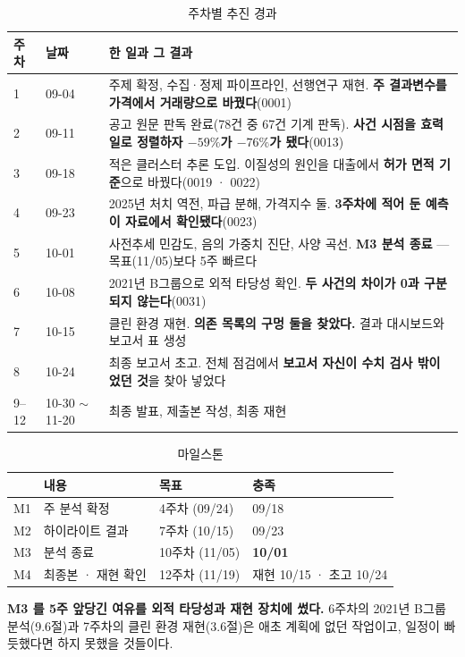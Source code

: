 \begin{table}[htbp]
  \centering
  \caption{주차별 추진 경과}
  \label{tab:v2-schedule}
  \footnotesize
  \begin{tabular}{llp{9.6cm}}
    \toprule
    \textbf{주차} & \textbf{날짜} & \textbf{한 일과 그 결과} \\
    \midrule
    1 & 09-04 & 주제 확정, 수집·정제 파이프라인, 선행연구 재현.
      \textbf{주 결과변수를 가격에서 거래량으로 바꿨다}(0001) \\
    2 & 09-11 & 공고 원문 판독 완료(78건 중 67건 기계 판독).
      \textbf{사건 시점을 효력일로 정렬하자 $-59\%$가 $-76\%$가 됐다}(0013) \\
    3 & 09-18 & 적은 클러스터 추론 도입. 이질성의 원인을 대출에서
      \textbf{허가 면적 기준}으로 바꿨다(0019 · 0022) \\
    4 & 09-23 & 2025년 처치 역전, 파급 분해, 가격지수 둘.
      \textbf{3주차에 적어 둔 예측이 자료에서 확인됐다}(0023) \\
    5 & 10-01 & 사전추세 민감도, 음의 가중치 진단, 사양 곡선.
      \textbf{M3 분석 종료} --- 목표(11/05)보다 5주 빠르다 \\
    6 & 10-08 & 2021년 B그룹으로 외적 타당성 확인.
      \textbf{두 사건의 차이가 0과 구분되지 않는다}(0031) \\
    7 & 10-15 & 클린 환경 재현. \textbf{의존 목록의 구멍 둘을 찾았다.}
      결과 대시보드와 보고서 표 생성 \\
    8 & 10-24 & 최종 보고서 초고. 전체 점검에서
      \textbf{보고서 자신이 수치 검사 밖이었던 것}을 찾아 넣었다 \\
    9--12 & 10-30 $\sim$ 11-20 & 최종 발표, 제출본 작성, 최종 재현 \\
    \bottomrule
  \end{tabular}
\end{table}

\begin{table}[htbp]
  \centering
  \caption{마일스톤}
  \label{tab:v2-milestone}
  \begin{tabular}{llll}
    \toprule
    & \textbf{내용} & \textbf{목표} & \textbf{충족} \\
    \midrule
    M1 & 주 분석 확정 & 4주차 (09/24) & 09/18 \\
    M2 & 하이라이트 결과 & 7주차 (10/15) & 09/23 \\
    M3 & 분석 종료 & 10주차 (11/05) & \textbf{10/01} \\
    M4 & 최종본 · 재현 확인 & 12주차 (11/19) & 재현 10/15 · 초고 10/24 \\
    \bottomrule
  \end{tabular}
\end{table}

\textbf{M3 를 5주 앞당긴 여유를 외적 타당성과 재현 장치에 썼다.} 6주차의 2021년
B그룹 분석(9.6절)과 7주차의 클린 환경 재현(3.6절)은 애초 계획에 없던 작업이고,
일정이 빠듯했다면 하지 못했을 것들이다.
